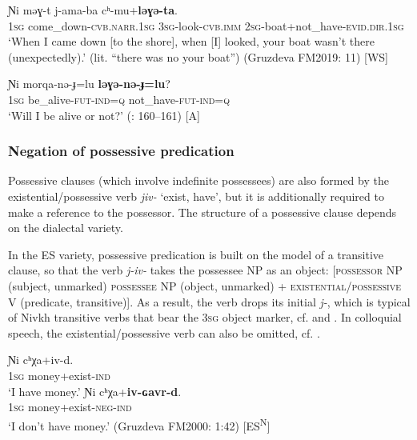\documentclass[output=paper,colorlinks,citecolor=brown]{langscibook}
\begin{document}
\ea\label{ex:niv:42}
    \gll Ɲi məɣ{}-t j-ama-ba cʰ-mu+\textbf{ləɣə{}-ta}.\\ 
         \textsc{1sg} come\_down-\textsc{cvb.narr.1sg} \textsc{3sg-}look-\textsc{cvb.imm} \textsc{2sg-}boat+not\_have-\textsc{evid.dir.1sg}\\
    \glt ‘When I came down [to the shore], when [I] looked, your boat wasn’t there (unexpectedly).’ (lit. “there was no your boat”) (Gruzdeva FM2019: 11) [WS]
\z 

\ea\label{ex:niv:43}
    \gll Ɲi morqa-nə{}-ɟ=lu \textbf{ləɣə{}-nə{}-ɟ=lu}? \\ 
         \textsc{1sg} be\_alive-\textsc{fut-ind=q} not\_have-\textsc{fut-ind=q} \\
    \glt ‘Will I be alive or not?’ (\citealt{Panfilov1965}: 160–161) [A]
\z 

\subsubsection{Negation of possessive predication}\label{sec:niv:2.3.2} 

Possessive clauses (which involve indefinite possessees) are also formed by the existential/possessive verb \textit{jiv-} ‘exist, have’, but it is additionally required to make a reference to the possessor. The structure of a possessive clause depends on the dialectal variety.

In the ES variety, possessive predication is built on the model of a transitive clause, so that the verb \textit{j-iv-} takes the possessee NP as an object: [\textsc{possessor} \textsc{NP} (subject, unmarked) \textsc{possessee} \textsc{NP} (object, unmarked) + \textsc{existential}/\textsc{possessive} \textsc{V} (predicate, transitive)]. As a result, the verb drops its initial \textit{j-}, which is typical of Nivkh transitive verbs that bear the \textsc{3sg} object marker, cf.  and . In colloquial speech, the existential/possessive verb can also be omitted, cf. .


\ea\label{ex:niv:44}
    \ea\label{ex:niv:44a}
        \gll Ɲi cʰχa+iv-d. \\ 
             \textsc{1sg} money+exist-\textsc{ind} \\
        \glt ‘I have money.’
    \ex\label{ex:niv:44b}
        \gll Ɲi cʰχa+\textbf{iv-ɢavr-d}. \\
             \textsc{1sg} money+exist-\textsc{neg-ind}\\
        \glt ‘I don’t have money.’ (Gruzdeva FM2000: 1:42) [ES\textsuperscript{N}]
    \z
\z 
\end{document}
